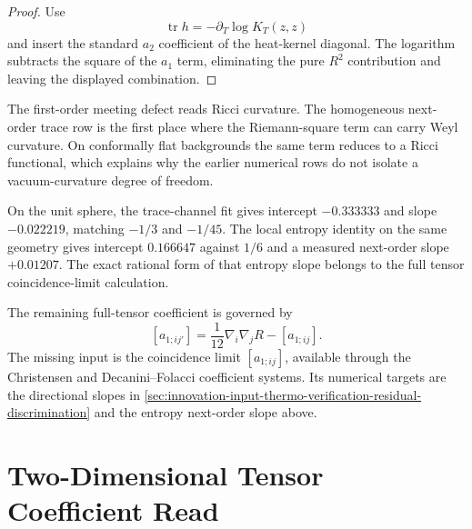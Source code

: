 \begin{proof}
Use
$$
\operatorname{tr}h=-\partial_T\log K_T(z,z)
$$
and insert the standard $a_2$ coefficient of the heat-kernel diagonal. The
logarithm subtracts the square of the $a_1$ term, eliminating the pure
$R^2$ contribution and leaving the displayed combination.
\end{proof}

\begin{principle}
\label{prin:innovation-input-thermo-weyl-visibility-order}
The first-order meeting defect reads Ricci curvature. The homogeneous
next-order trace row is the first place where the Riemann-square term can
carry Weyl curvature. On conformally flat backgrounds the same term
reduces to a Ricci functional, which explains why the earlier numerical
rows do not isolate a vacuum-curvature degree of freedom.
\end{principle}

\begin{principle}
\label{prin:innovation-input-thermo-next-order-numerical-witnesses}
On the unit sphere, the trace-channel fit gives intercept $-0.333333$ and
slope $-0.022219$, matching $-1/3$ and $-1/45$. The local entropy identity
on the same geometry gives intercept $0.166647$ against $1/6$ and a
measured next-order slope $+0.01207$. The exact rational form of that
entropy slope belongs to the full tensor coincidence-limit calculation.
\end{principle}

\begin{principle}
\label{prin:innovation-input-thermo-full-tensor-target}
The remaining full-tensor coefficient is governed by
$$
[a_{1;ij'}]
=
\frac{1}{12}\nabla_i\nabla_jR
-
[a_{1;ij}].
$$
The missing input is the coincidence limit $[a_{1;ij}]$, available through
the Christensen and Decanini--Folacci coefficient systems. Its numerical
targets are the directional slopes in
\autoref{sec:innovation-input-thermo-verification-residual-discrimination}
and the entropy next-order slope above.
\end{principle}

\section{Two-Dimensional Tensor Coefficient Read}
\label{sec:innovation-input-thermo-verification-two-dimensional-tensor-coefficient}

